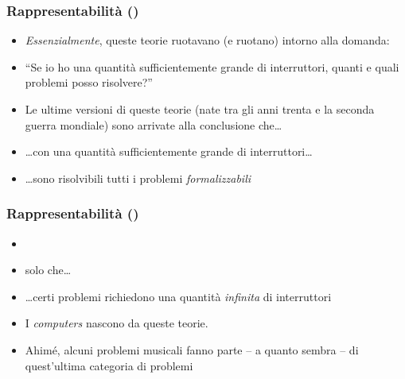 \begin{frame}

  \frametitle{Rappresentabilit\`a ()}

	\begin{itemize}[<+- | alert@+->]
    
      \item{\emph{Essenzialmente}, queste teorie ruotavano (e ruotano) intorno alla domanda:}

      \item{``Se io ho una quantit\`a sufficientemente grande di interruttori,
          quanti e quali problemi posso risolvere?''}

      \item{Le ultime versioni di queste teorie (nate tra gli anni trenta e la
          seconda guerra mondiale) sono arrivate alla conclusione che\dots}

      \item{\dots con una quantit\`a sufficientemente grande di
          interruttori\dots}

      \item{\dots sono risolvibili tutti i problemi \emph{formalizzabili}}

	\end{itemize}

\end{frame}

\begin{frame}

  \frametitle{Rappresentabilit\`a ()}

  \vspace{-2ex}
	\begin{itemize}[<+- | alert@+->]
      \item[~]{~}
      \item{solo che\dots}

      \item{\dots certi problemi richiedono una quantit\`a \emph{infinita} di
          interruttori} %

      \item{I \emph{computers} nascono da queste teorie.}

      \item{Ahim\'e, alcuni problemi musicali fanno parte -- a quanto
          sembra -- di quest'ultima categoria di problemi}

	\end{itemize}
  
\end{frame}

